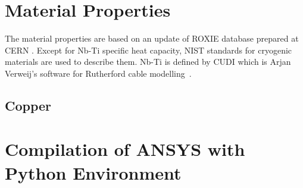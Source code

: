 \documentclass{article}
\begin{document}
\clearpage
\begin{appendices}

\section{Material Properties}
\label{appendix_material_properties_description}

The material properties are based on an update of ROXIE database prepared at CERN \cite{material_properties_roxie}. Except for Nb-Ti specific heat capacity, NIST standards for cryogenic materials are used to describe them. Nb-Ti is defined by CUDI which is Arjan Verweij's software for Rutherford cable modelling~\cite{cudi_manual}.  

\subsection{Copper}
\label{appendix:cu_material_properties}


% 

% 

\section{Compilation of ANSYS with Python Environment}
\label{appendix:python_ansys_compilation}



\end{appendices}

\clearpage


\end{document}
